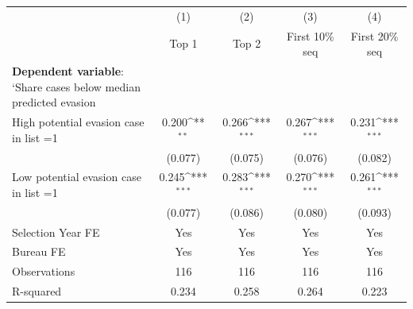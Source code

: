 {
\def\sym#1{\ifmmode^{#1}\else\(^{#1}\)\fi}
\begin{tabular}{l*{4}{c}}
\toprule
            &\multicolumn{1}{c}{(1)}&\multicolumn{1}{c}{(2)}&\multicolumn{1}{c}{(3)}&\multicolumn{1}{c}{(4)}\\
            &\multicolumn{1}{c}{Top 1}&\multicolumn{1}{c}{Top 2}&\multicolumn{1}{c}{First 10\% seq}&\multicolumn{1}{c}{First 20\% seq}\\
\midrule
\textbf{Dependent variable}: `Share cases below median predicted evasion&                     &                     &                     &                     \\
\addlinespace
High potential evasion case in list =1&       0.200\sym{**} &       0.266\sym{***}&       0.267\sym{***}&       0.231\sym{***}\\
            &     (0.077)         &     (0.075)         &     (0.076)         &     (0.082)         \\
\addlinespace
Low potential evasion case in list =1&       0.245\sym{***}&       0.283\sym{***}&       0.270\sym{***}&       0.261\sym{***}\\
            &     (0.077)         &     (0.086)         &     (0.080)         &     (0.093)         \\
\midrule
Selection Year FE&         Yes         &         Yes         &         Yes         &         Yes         \\
Bureau FE   &         Yes         &         Yes         &         Yes         &         Yes         \\
Observations&         116         &         116         &         116         &         116         \\
R-squared   &       0.234         &       0.258         &       0.264         &       0.223         \\
\bottomrule
\end{tabular}
}

